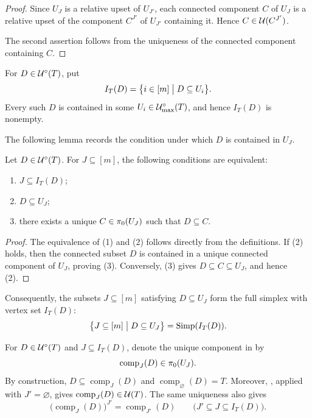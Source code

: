\begin{proof}
Since $U_J$ is a relative upset of $U_{J'}$, each connected component
$C$ of $U_J$ is a relative upset of the component $C^{J'}$ of
$U_{J'}$ containing it.  Hence $C\in\mathcal U(C^{J'})$.

The second assertion follows from the uniqueness of the connected
component containing $C$.
\end{proof}

For $D\in\mathcal U^\circ(T)$, put
\begin{equation}
I_T(D)
=
\bigl\{
i\in[m]
\bigm|
D\subseteq U_i
\bigr\}.
\label{eq:ITD-definition}
\end{equation}
Every such $D$ is contained in some
$U_i\in\mathcal U^\circ_{\max}(T)$, and hence $I_T(D)$ is nonempty.

The following lemma records the condition under which $D$ is contained
in $U_J$.

\begin{lemma}
\label{lem:unique-lift-admissible-support}
Let $D\in\mathcal U^\circ(T)$. For $J\subseteq[m]$,
the following conditions are equivalent:
\begin{enumerate}[\rm (1)]
    \item $J\subseteq I_T(D)$;
    \item $D\subseteq U_J$;
    \item there exists a unique $C\in\pi_0(U_J)$ such that
    $D\subseteq C$.
\end{enumerate}
\end{lemma}

\begin{proof}
The equivalence of \textup{(1)} and \textup{(2)} follows directly from
the definitions. If \textup{(2)} holds, then the connected subset $D$
is contained in a unique connected component of $U_J$, proving
\textup{(3)}. Conversely, \textup{(3)} gives
$D\subseteq C\subseteq U_J$, and hence \textup{(2)}.
\end{proof}

Consequently, the subsets $J\subseteq[m]$ satisfying
$D\subseteq U_J$ form the full simplex with vertex set $I_T(D)$:
\begin{equation}
\bigl\{
J\subseteq[m]
\bigm|
D\subseteq U_J
\bigr\}
=
\operatorname{Simp}(I_T(D)).
\label{eq:ITD-simplex}
\end{equation}


For $D\in\mathcal U^\circ(T)$ and
$J\subseteq I_T(D)$, denote the unique component in
 by
\begin{equation}
\label{eq:compJD-definition}
\operatorname{comp}_J(D)\in\pi_0(U_J).
\end{equation}
By construction,
$D\subseteq\operatorname{comp}_J(D)$ and
$\operatorname{comp}_\varnothing(D)=T$.
Moreover, , applied
with $J'=\varnothing$, gives
$\operatorname{comp}_J(D)\in\mathcal U(T)$.
The same uniqueness also gives
\begin{equation}
\label{eq:lifted-component-compatibility}
\bigl(\operatorname{comp}_J(D)\bigr)^{J'}
=
\operatorname{comp}_{J'}(D)
\qquad
\bigl(J'\subseteq J\subseteq I_T(D)\bigr).
\end{equation}


